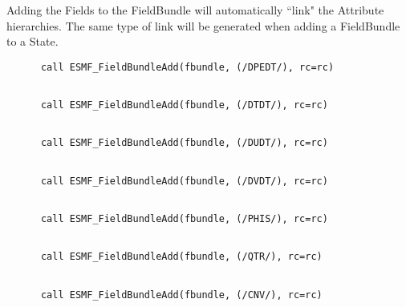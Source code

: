 
       Adding the Fields to the FieldBundle will automatically ``link" the
       Attribute hierarchies.  The same type of link will be generated
       when adding a FieldBundle to a State. 

 \begin{verbatim}
      call ESMF_FieldBundleAdd(fbundle, (/DPEDT/), rc=rc)
 
\end{verbatim}
 

 \begin{verbatim}
      call ESMF_FieldBundleAdd(fbundle, (/DTDT/), rc=rc)
 
\end{verbatim}
 

 \begin{verbatim}
      call ESMF_FieldBundleAdd(fbundle, (/DUDT/), rc=rc)
 
\end{verbatim}
 

 \begin{verbatim}
      call ESMF_FieldBundleAdd(fbundle, (/DVDT/), rc=rc)
 
\end{verbatim}
 

 \begin{verbatim}
      call ESMF_FieldBundleAdd(fbundle, (/PHIS/), rc=rc)
 
\end{verbatim}
 

 \begin{verbatim}
      call ESMF_FieldBundleAdd(fbundle, (/QTR/), rc=rc)
 
\end{verbatim}
 

 \begin{verbatim}
      call ESMF_FieldBundleAdd(fbundle, (/CNV/), rc=rc)
 
\end{verbatim}
 

